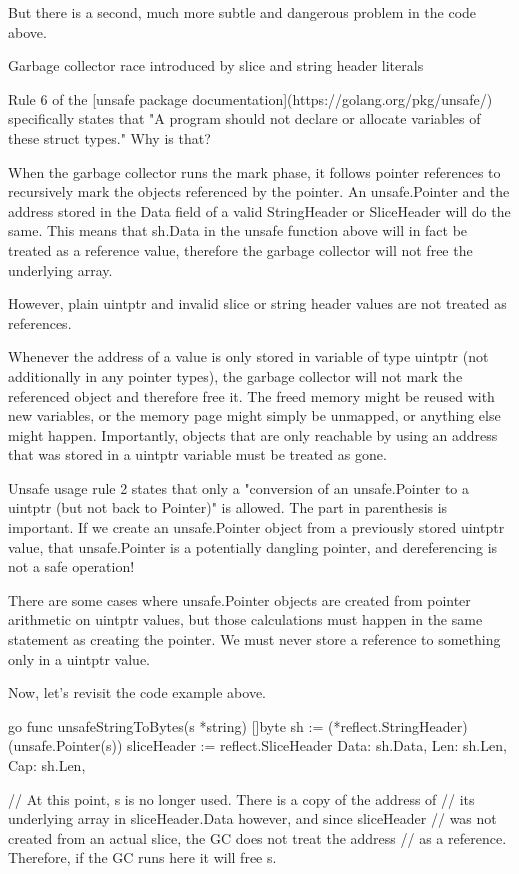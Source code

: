 But there is a second, much more subtle and dangerous problem in the code above.


 Garbage collector race introduced by slice and string header literals

Rule 6 of the [unsafe package documentation](https://golang.org/pkg/unsafe/) specifically states that "A program
should not declare or allocate variables of these struct types." Why is that?

When the garbage collector runs the mark phase, it follows pointer references to recursively mark the objects referenced
by the pointer. An unsafe.Pointer and the address stored in the Data field of a valid StringHeader or SliceHeader
will do the same. This means that sh.Data in the unsafe function above will in fact be treated as a reference value,
therefore the garbage collector will not free the underlying array.

However, plain uintptr and invalid slice or string header values are not treated as references.

Whenever the address of a value is only stored in variable of type uintptr (not additionally in any pointer types),
the garbage collector will not mark the referenced object and therefore free it. The freed memory might be reused with
new variables, or the memory page might simply be unmapped, or anything else might happen. Importantly, objects that are
only reachable by using an address that was stored in a uintptr variable must be treated as gone.

Unsafe usage rule 2 states that only a "conversion of an unsafe.Pointer to a uintptr (but not back to Pointer)"
is allowed. The part in parenthesis is important. If we create an unsafe.Pointer object from a previously stored
uintptr value, that unsafe.Pointer is a potentially dangling pointer, and dereferencing is not a safe operation!

There are some cases where unsafe.Pointer objects are created from pointer arithmetic on uintptr values, but those
calculations must happen in the same statement as creating the pointer. We must never store a reference to something
only in a uintptr value.

Now, let's revisit the code example above.

go
func unsafeStringToBytes(s *string) []byte 
	sh := (*reflect.StringHeader)(unsafe.Pointer(s))
	sliceHeader := reflect.SliceHeader
		Data: sh.Data,
		Len:  sh.Len,
		Cap:  sh.Len,
	

    // At this point, s is no longer used. There is a copy of the address of
    // its underlying array in sliceHeader.Data however, and since sliceHeader
    // was not created from an actual slice, the GC does not treat the address
    // as a reference. Therefore, if the GC runs here it will free s.

